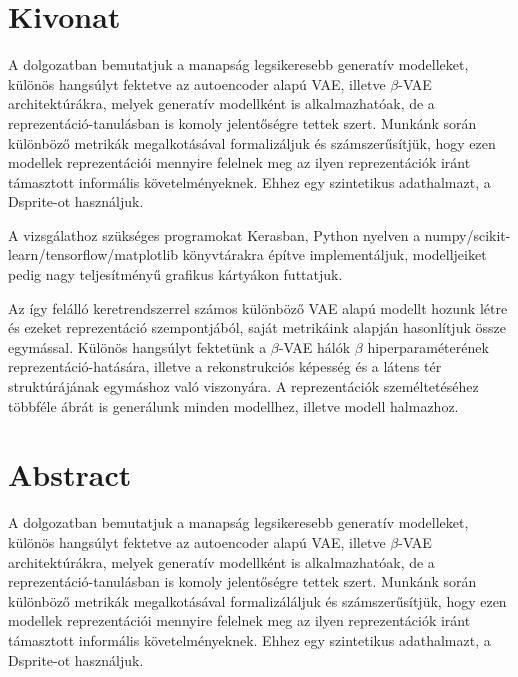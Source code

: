 \chapter*{Kivonat}

A dolgozatban bemutatjuk a manapság legsikeresebb generatív modelleket, különös hangsúlyt fektetve az autoencoder alapú VAE, illetve $\beta$-VAE architektúrákra, melyek generatív modellként is alkalmazhatóak, de a reprezentáció-tanulásban is komoly jelentőségre tettek szert. Munkánk során különböző metrikák megalkotásával formalizáljuk és számszerűsítjük, hogy ezen modellek reprezentációi mennyire felelnek meg az ilyen reprezentációk iránt támasztott informális követelményeknek. Ehhez egy szintetikus adathalmazt, a Dsprite-ot használjuk.

A vizsgálathoz szükséges programokat Kerasban, Python nyelven a numpy/scikit-learn/tensorflow/matplotlib könyvtárakra építve implementáljuk, modelljeiket pedig nagy teljesítményű grafikus kártyákon futtatjuk. 

Az így felálló keretrendszerrel számos különböző VAE alapú modellt hozunk létre és ezeket reprezentáció szempontjából, saját metrikáink alapján hasonlítjuk össze egymással. Különös hangsúlyt fektetünk a $\beta$-VAE hálók $\beta$ hiperparaméterének reprezentáció-hatására, illetve a rekonstrukciós képesség és a látens tér struktúrájának egymáshoz való viszonyára. A reprezentációk személtetéséhez többféle ábrát is generálunk minden modellhez, illetve modell halmazhoz.

\vfill

\chapter*{Abstract}

A dolgozatban bemutatjuk a manapság legsikeresebb generatív modelleket, különös hangsúlyt fektetve az autoencoder alapú VAE, illetve $\beta$-VAE architektúrákra, melyek generatív modellként is alkalmazhatóak, de a reprezentáció-tanulásban is komoly jelentőségre tettek szert. Munkánk során különböző metrikák megalkotásával formalizáláljuk és számszerűsítjük, hogy ezen modellek reprezentációi mennyire felelnek meg az ilyen reprezentációk iránt támasztott informális követelményeknek. Ehhez egy szintetikus adathalmazt, a Dsprite-ot használjuk.

